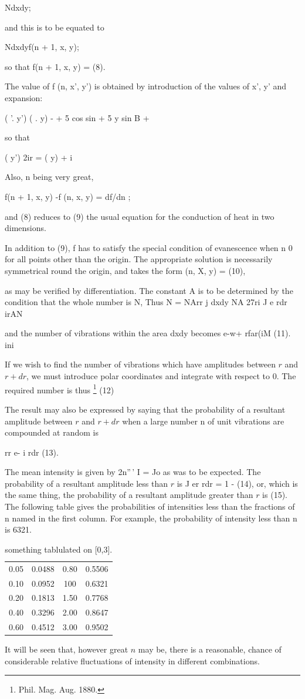 Ndxdy;

and this is to be equated to

Ndxdyf(n + 1, x, y);

so  that
f(n + 1, x, y) = (8).

The value of f (n, x', y') is
obtained by introduction of the values of x', y' and expansion:

( '. y') (
. y) - + 5 cos sin + 5 y sin B +

so that

( y') 2ir = ( y) + i

Also, n being very great,

f(n + 1, x, y) -f (n, x, y) = df/dn ;

and (8) reduces to
(9)
the usual equation for the conduction of heat in two dimensions.

In addition to (9), f has to satisfy the special condition of evanescence
when n 0 for all points other than the origin. The appropriate solution
is necessarily symmetrical round the origin, and takes the form (n, X,
y) = (10),

as may be verified by differentiation. The constant A is to
be determined by the condition that the whole number is N, Thus N = NArr
j dxdy NA 27ri J e rdr irAN

and the number of vibrations within the
area dxdy becomes e-w+ rfar(iM (11). ini

If we wish to find the number of vibrations which have amplitudes between \(r\) and
\(r+dr\),
 we must introduce polar coordinates and integrate with respect to
0.
The required number is thus \footnote{Phil. Mag. Aug. 1880.} (12)

The result may also be expressed by saying that the probability
of a resultant amplitude between \(r\) and \(r+dr\) when a large
number n of unit vibrations are compounded at random is

rr e- i rdr (13).

The mean intensity is given by 2n''\,' I = Jo as was to be expected. The
probability of a resultant amplitude less than \(r\) is J er rdr = 1 - (14),
or, which is the same thing, the probability of a resultant amplitude
greater than \(r\) is (15). The following table gives the probabilities of
intensities less than the fractions of n named in the first column. For
example, the probability of intensity less than n is 6321.
\begin{table}[h]
\centering
\begin{tabular}{cccc}
0.05 & 0.0488 & 0.80 & 0.5506\\
0.10 & 0.0952 & 100 & 0.6321\\
0.20 & 0.1813 & 1.50 & 0.7768\\
0.40 & 0.3296 & 2.00 & 0.8647\\
0.60 & 0.4512 & 3.00 & 0.9502\\
\end{tabular}
\caption{something tablulated on [0,3].}
\end{table}
It will be seen that, however great \(n\) may be, there is a reasonable, chance
of considerable relative fluctuations of intensity in different combinations.

